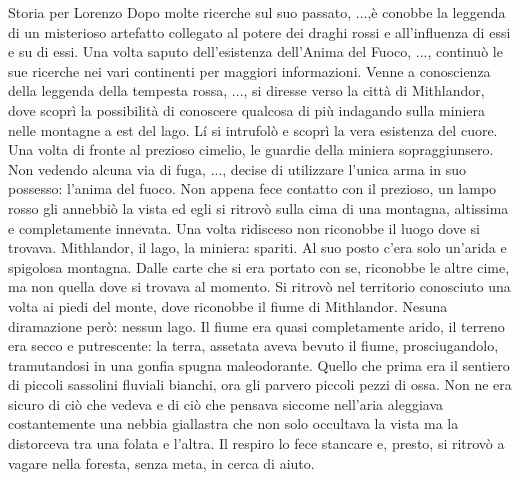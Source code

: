 \begin{commentbox}{Storia per Lorenzo}
  Dopo molte ricerche sul suo passato, ...,\`e conobbe la leggenda di un
  misterioso artefatto collegato al potere dei draghi rossi e all'influenza di essi e
  su di essi. Una volta saputo dell'esistenza dell'Anima del Fuoco, ..., continu\`o
  le sue ricerche nei vari continenti per maggiori informazioni. Venne a conoscienza della
  leggenda della tempesta rossa, ..., si diresse verso la citt\`a di Mithlandor, dove
  scopr\`i la possibilit\`a di conoscere qualcosa di pi\`u indagando sulla miniera
  nelle montagne a est del lago.
  L\'i  si intrufol\`o e scopr\`i la vera esistenza del cuore.
  Una volta di fronte al prezioso cimelio, le guardie della miniera
  sopraggiunsero. Non vedendo alcuna via di fuga, ..., decise di utilizzare l'unica arma in
  suo possesso: l'anima del fuoco. Non appena fece contatto con il prezioso, un lampo rosso
  gli annebbi\`o la vista ed egli si ritrov\`o sulla cima di una montagna, altissima e
  completamente innevata. Una volta ridisceso non riconobbe il luogo dove si trovava.
  Mithlandor, il lago, la miniera: spariti. Al suo posto c'era solo un'arida e spigolosa
  montagna. Dalle carte che si era portato con se, riconobbe le altre cime, ma non quella
  dove si trovava al momento. Si ritrov\`o nel territorio conosciuto
  una volta ai piedi del monte, dove riconobbe il fiume di Mithlandor.
  Nesuna diramazione per\`o: nessun lago. Il fiume era quasi completamente arido,
  il terreno era secco e putrescente: la terra, assetata aveva bevuto il fiume,
  prosciugandolo, tramutandosi in una gonfia spugna maleodorante.
  Quello che prima era il sentiero di piccoli sassolini fluviali bianchi, ora gli parvero
  piccoli pezzi di ossa. Non ne era sicuro di ci\`o che vedeva e di ci\`o che pensava
  siccome nell'aria aleggiava costantemente una nebbia giallastra che non solo
  occultava la vista ma la distorceva tra una folata e l'altra.
  Il respiro lo fece stancare e, presto, si ritrov\`o a vagare nella foresta, senza meta,
  in cerca di aiuto.
\end{commentbox}